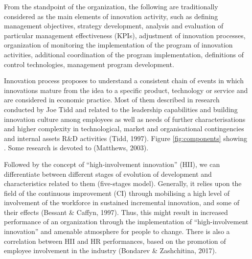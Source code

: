 \documentclass[12pt,twoside]{reedthesis}
\begin{document}
From the standpoint of the organization, the following are traditionally considered as the main elements of innovation activity, such as defining management objectives, strategy development, analysis and evaluation of particular management effectiveness (KPIs), adjustment of innovation processes, organization of monitoring the implementation of the program of innovation activities, additional coordination of the program implementation, definitions of control technologies, management program development.

Innovation process proposes to understand a consistent chain of events in which innovations mature from the idea to a specific product, technology or service and are considered in economic practice. Most of them described in research conducted by Joe Tidd and related to the leadership capabilities and building innovation culture among employees as well as needs of further characterisations and higher complexity in technological, market and organisational contingencies and internal assets R\&D activities (Tidd, 1997). Figure \ref{fig:components} showing . Some research is devoted to (Matthews, 2003).

Followed by the concept of ``high-involvement innovation'' (HII), we can differentiate between different stages of evolution of development and characteristics related to them (five-stages model). Generally, it relies upon the field of the continuous improvement (CI) through mobilising a high level of involvement of the workforce in sustained incremental innovation, and some of their effects (Bessant \& Caffyn, 1997). Thus, this might result in increased performance of an organization through the implementation of ``high-involvement innovation'' and amenable atmosphere for people to change. There is also a correlation between HII and HR performances, based on the promotion of employee involvement in the industry (Bondarev \& Zashchitina, 2017).
\end{document}
